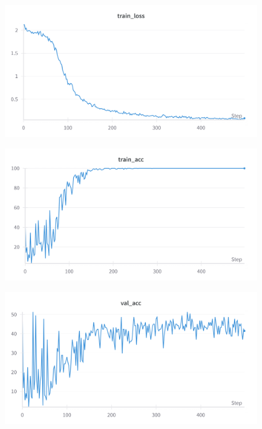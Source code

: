 \documentclass{article}
\begin{document}
\begin{figure}[hbtp]
    \centering

    \begin{minipage}{0.6\textwidth}
        \centering
        \includegraphics[width=\textwidth]{Images/cnn3_train_loss.png}
        \label{fig:cnn3_train_loss}
    \end{minipage}

    \vspace*{0.4cm}

    \begin{minipage}{0.6\textwidth}
        \centering
        \includegraphics[width=\textwidth]{Images/cnn3_train_acc.png}
        \label{fig:cnn3_train_acc}
    \end{minipage}

    \vspace*{0.4cm}

    \begin{minipage}{0.6\textwidth}
        \centering
        \includegraphics[width=\textwidth]{Images/cnn3_val_acc.png}
        \label{fig:cnn3_val_acc}
    \end{minipage}


\end{figure}
\end{document}
